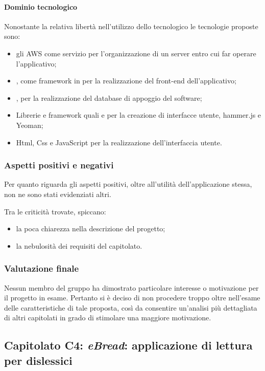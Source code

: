 			\paragraph{Dominio tecnologico}
			Nonostante la relativa libertà nell'utilizzo dello  tecnologico le tecnologie proposte sono:
			\begin{itemize}
				\item gli AWS come servizio per l'organizzazione di un server entro cui far operare l'applicativo;
				\item {}, come framework in  per la realizzazione del front-end dell'applicativo;
				\item {}, per la realizzazione del database di appoggio del software;
				\item Librerie e framework quali  e  per la creazione di interfacce utente, hammer.js e Yeoman;
				\item Html, Css e JavaScript per la realizzazione dell'interfaccia utente.
			\end{itemize}
		\subsubsection{Aspetti positivi e negativi}
		Per quanto riguarda gli aspetti positivi, oltre all'utilità dell'applicazione stessa, non ne sono stati evidenziati altri.
		
		Tra le criticità trovate, spiccano:
		\begin{itemize}
			\item la poca chiarezza nella descrizione del progetto;
			\item la nebulosità dei requisiti del capitolato.
		\end{itemize}
		\subsubsection{Valutazione finale}
		Nessun membro del gruppo ha dimostrato particolare interesse o motivazione per il progetto in esame. Pertanto si è deciso di non procedere 
		troppo oltre nell'esame delle caratteristiche di tale proposta, così da consentire un'analisi più dettagliata di altri capitolati in grado 
		di stimolare una maggiore motivazione.
		
	\subsection{Capitolato C4: \emph{eBread}: applicazione di lettura per dislessici}
